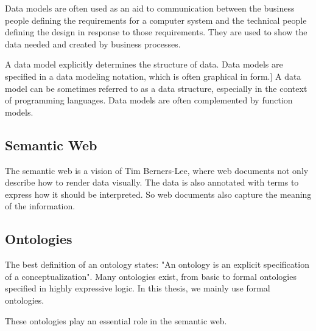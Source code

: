 Data models are often used as an aid to communication between the business people defining the requirements for a computer system and the technical people defining the design in response to those requirements. They are used to show the data needed and created by business processes.
 
A data model explicitly determines the structure of data. Data models are specified in a data modeling notation, which is often graphical in form.]
A data model can be sometimes referred to as a data structure, especially in the context of programming languages. Data models are often complemented by function models.

\subsection{Semantic Web}
The semantic web is a vision of Tim Berners-Lee, where web documents not only describe how to render data visually. The data is also annotated with terms to express how it should be interpreted. So web documents also capture the meaning of the information.

\subsection{Ontologies}
The best definition of an ontology states: "An ontology is an explicit specification of a conceptualization"\cite{gruber_translation_1993}. Many ontologies exist, from basic to formal ontologies specified in highly expressive logic. In this thesis, we mainly use formal ontologies.

These ontologies play an essential role in the semantic web. 